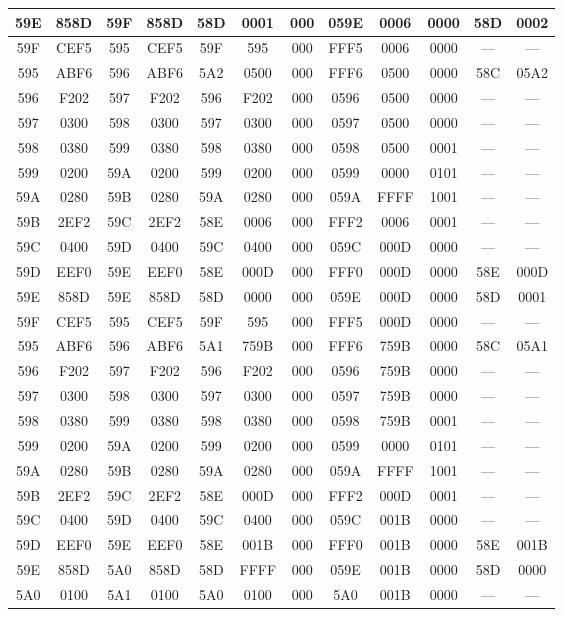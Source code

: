 {\begin{center}
\begin{tabular}{|c|c|c|c|c|c|c|c|c|c|c|c|}
		\hline
		59E & 858D & 59F & 858D & 58D & 0001 & 000 & 059E & 0006 & 0000 & 58D & 0002\\
		\hline
		59F & CEF5 & 595 & CEF5 & 59F & 595 & 000 & FFF5 & 0006 & 0000 & --- & ---\\
		\hline
		595 & ABF6 & 596 & ABF6 & 5A2 & 0500 & 000 & FFF6 & 0500 & 0000 & 58C & 05A2\\
		\hline
		596 & F202 & 597 & F202 & 596 & F202 & 000 & 0596 & 0500 & 0000 & --- & ---\\
		\hline
		597 & 0300 & 598 & 0300 & 597 & 0300 & 000 & 0597 & 0500 & 0000 & --- & ---\\
		\hline
		598 & 0380 & 599 & 0380 & 598 & 0380 & 000 & 0598 & 0500 & 0001 & --- & ---\\
		\hline
		599 & 0200 & 59A & 0200 & 599 & 0200 & 000 & 0599 & 0000 & 0101 & --- & ---\\
		\hline
		59A & 0280 & 59B & 0280 & 59A & 0280 & 000 & 059A & FFFF & 1001 & --- & ---\\
		\hline
		59B & 2EF2 & 59C & 2EF2 & 58E & 0006 & 000 & FFF2 & 0006 & 0001 & --- & ---\\
		\hline
		59C & 0400 & 59D & 0400 & 59C & 0400 & 000 & 059C & 000D & 0000 & --- & ---\\
		\hline
		59D & EEF0 & 59E & EEF0 & 58E & 000D & 000 & FFF0 & 000D & 0000 & 58E & 000D\\
		\hline
		59E & 858D & 59E & 858D & 58D & 0000 & 000 & 059E & 000D & 0000 & 58D & 0001\\
		\hline
		59F & CEF5 & 595 & CEF5 & 59F & 595 & 000 & FFF5 & 000D & 0000 & --- & ---\\
		\hline
		595 & ABF6 & 596 & ABF6 & 5A1 & 759B & 000 & FFF6 & 759B & 0000 & 58C & 05A1\\
		\hline
		596 & F202 & 597 & F202 & 596 & F202 & 000 & 0596 & 759B & 0000 & --- & ---\\
		\hline
		597 & 0300 & 598 & 0300 & 597 & 0300 & 000 & 0597 & 759B & 0000 & --- & ---\\
		\hline
		598 & 0380 & 599 & 0380 & 598 & 0380 & 000 & 0598 & 759B & 0001 & --- & ---\\
		\hline
		599 & 0200 & 59A & 0200 & 599 & 0200 & 000 & 0599 & 0000 & 0101 & --- & ---\\
		\hline
		59A & 0280 & 59B & 0280 & 59A & 0280 & 000 & 059A & FFFF & 1001 & --- & ---\\
		\hline
		59B & 2EF2 & 59C & 2EF2 & 58E & 000D & 000 & FFF2 & 000D & 0001 & --- & ---\\
		\hline
		59C & 0400 & 59D & 0400 & 59C & 0400 & 000 & 059C & 001B & 0000 & --- & ---\\
		\hline
		59D & EEF0 & 59E & EEF0 & 58E & 001B & 000 & FFF0 & 001B & 0000 & 58E & 001B\\
		\hline
		59E & 858D & 5A0 & 858D & 58D & FFFF & 000 & 059E & 001B & 0000 & 58D & 0000\\
		\hline
		5A0 & 0100 & 5A1 & 0100 & 5A0 & 0100 & 000 & 5A0 & 001B & 0000 & --- & ---\\
		\hline
	\end{tabular}
\end{center}

}

